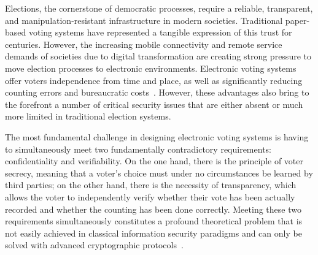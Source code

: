 \documentclass[a4paper,fleqn]{cas-sc}
\begin{document}

Elections, the cornerstone of democratic processes, require a reliable, transparent, and manipulation-resistant infrastructure in modern societies. Traditional paper-based voting systems have represented a tangible expression of this trust for centuries. However, the increasing mobile connectivity and remote service demands of societies due to digital transformation are creating strong pressure to move election processes to electronic environments. Electronic voting systems offer voters independence from time and place, as well as significantly reducing counting errors and bureaucratic costs~\cite{Gibson2016}. However, these advantages also bring to the forefront a number of critical security issues that are either absent or much more limited in traditional election systems.


The most fundamental challenge in designing electronic voting systems is having to simultaneously meet two fundamentally contradictory requirements: confidentiality and verifiability. On the one hand, there is the principle of voter secrecy, meaning that a voter's choice must under no circumstances be learned by third parties; on the other hand, there is the necessity of transparency, which allows the voter to independently verify whether their vote has been actually recorded and whether the counting has been done correctly. Meeting these two requirements simultaneously constitutes a profound theoretical problem that is not easily achieved in classical information security paradigms and can only be solved with advanced cryptographic protocols~\cite{Bernhard2012}.
\end{document}
